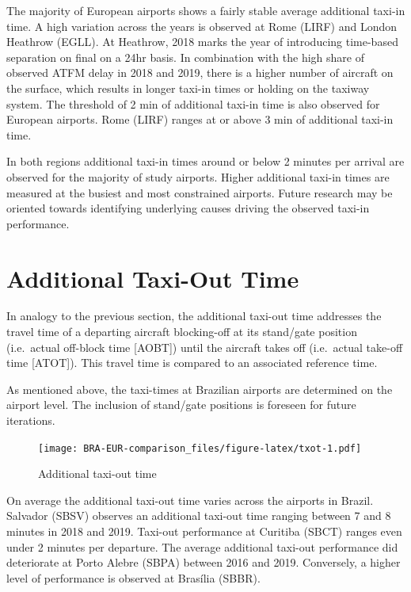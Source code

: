 \documentclass[
]{book}
\begin{document}
The majority of European airports shows a fairly stable average additional taxi-in time.
A high variation across the years is observed at Rome (LIRF) and London Heathrow (EGLL).
At Heathrow, 2018 marks the year of introducing time-based separation on final on a 24hr basis.
In combination with the high share of observed ATFM delay in 2018 and 2019, there is a higher number of aircraft on the surface, which results in longer taxi-in times or holding on the taxiway system.
The threshold of 2 min of additional taxi-in time is also observed for European airports.
Rome (LIRF) ranges at or above 3 min of additional taxi-in time.

In both regions additional taxi-in times around or below 2 minutes per arrival are observed for the majority of study airports.
Higher additional taxi-in times are measured at the busiest and most constrained airports.
Future research may be oriented towards identifying underlying causes driving the observed taxi-in performance.

\hypertarget{additional-taxi-out-time}{%
\section{Additional Taxi-Out Time}\label{additional-taxi-out-time}}

In analogy to the previous section, the additional taxi-out time addresses the travel time of a departing aircraft blocking-off at its stand/gate position (i.e.~actual off-block time {[}AOBT{]}) until the aircraft takes off (i.e.~actual take-off time {[}ATOT{]}). This travel time is compared to an associated reference time.

As mentioned above, the taxi-times at Brazilian airports are determined on the airport level.
The inclusion of stand/gate positions is foreseen for future iterations.



\begin{figure}
\centering
\texttt{[image: BRA-EUR-comparison\_files/figure-latex/txot-1.pdf]}
\caption{\label{fig:txot}Additional taxi-out time}
\end{figure}

On average the additional taxi-out time varies across the airports in Brazil.
Salvador (SBSV) observes an additional taxi-out time ranging between 7 and 8 minutes in 2018 and 2019.
Taxi-out performance at Curitiba (SBCT) ranges even under 2 minutes per departure.
The average additional taxi-out performance did deteriorate at Porto Alebre (SBPA) between 2016 and 2019.
Conversely, a higher level of performance is observed at Brasília (SBBR).
\end{document}
